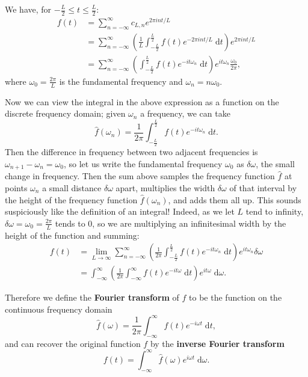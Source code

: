 \documentclass{article}
\newcommand{\diff}{\;\mathrm{d}}
\begin{document}
We have, for $-\frac{L}{2}\leq t\leq \frac{L}{2}$:
\begin{align*}
	f(t)&=\sum_{n=-\infty}^\infty c_{L,n} e^{2\pi i nt/L}\\
	&=\sum_{n=-\infty}^\infty \left(\frac{1}{L}\int_{-\frac{L}{2}}^{\frac{L}{2}}f(t)e^{-2\pi i nt/L}\diff t\right) e^{2\pi int/L}\\
	&= \sum_{n=-\infty}^\infty \left(\int_{-\frac{L}{2}}^{\frac{L}{2}} f(t) e^{-it\omega_n}\diff t \right) e^{it\omega_n}\frac{\omega_0}{2\pi},
\end{align*}
where $\omega_0=\frac{2\pi}{L}$ is the fundamental frequency and $\omega_n=n\omega_0$.

Now we can view the integral in the above expression as a function on the discrete frequency domain; given $\omega_n$ a frequency, we can take
\[\hat{f}(\omega_n)=\frac{1}{2\pi}\int_{-\frac{L}{2}}^{\frac{L}{2}} f(t)e^{-it\omega_n}\diff t.\]
Then the difference in frequency between two adjacent frequencies is $\omega_{n+1}-\omega_n = \omega_0$, so let us write the fundamental frequency $\omega_0$ as $\delta\omega$, the small change in frequency. Then the sum above samples the frequency function $\hat{f}$ at points $\omega_n$ a small distance $\delta\omega$ apart, multiplies the width $\delta\omega$ of that interval by the height of the frequency function $\hat{f}(\omega_n)$, and adds them all up. This sounds suspiciously like the definition of an integral! Indeed, as we let $L$ tend to infinity, $\delta\omega=\omega_0=\frac{2\pi}{L}$ tends to 0, so we are multiplying an infinitesimal width by the height of the function and summing:
\begin{align*}
	f(t)&=\lim_{L\to \infty}\sum_{n=-\infty}^\infty \left(\frac{1}{2\pi}\int_{-\frac{L}{2}}^{\frac{L}{2}} f(t) e^{-it\omega_n}\diff t \right) e^{it\omega_n}\delta\omega\\
	&=\int_{-\infty}^\infty \left(\frac{1}{2\pi}\int_{-\infty}^\infty f(t)e^{-it\omega}\diff t\right) e^{it\omega}\diff \omega.
\end{align*}


Therefore we define the \textbf{Fourier transform} of $f$ to be the function on the continuous frequency domain
\[\hat{f}(\omega)=\frac{1}{2\pi}\int_{-\infty}^\infty f(t)e^{-i\omega t}\diff t,\]
and can recover the original function $f$ by the \textbf{inverse Fourier transform}
\[f(t)=\int_{-\infty}^\infty \hat{f}(\omega)e^{i\omega t}\diff \omega.\]
\end{document}
